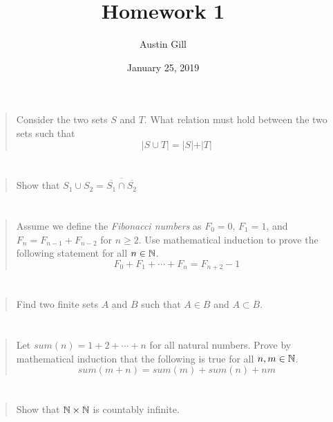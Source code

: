 \documentclass{article}
\title{Homework 1}
\author{Austin Gill}
\date{January 25, 2019}
\begin{document}
\maketitle

\section{}
\begin{quote}
    Consider the two sets $S$ and $T$. What relation must hold between the
    two sets such that
    \[\vert S \cup T \vert = \vert S \vert + \vert T \vert \]
\end{quote}

\section{}
\begin{quote}
    Show that $S_1 \cup S_2 = \overline{\overline{S_1} \cap \overline{S_2}}$
\end{quote}

\section{}
\begin{quote}
    Assume we define the \textit{Fibonacci numbers} as $F_0 = 0$, $F_1 = 1$,
    and $F_n = F_{n-1} + F_{n-2}$ for $n \geq 2$. Use mathematical induction to
    prove the following statement for all $n \in \mathbb{N}$.
    \[F_0 + F_1 + \cdots + F_n = F_{n + 2} - 1\]
\end{quote}

\section{}
\begin{quote}
    Find two finite sets $A$ and $B$ such that $A \in B$ and $A \subset B$.
\end{quote}

\section{}
\begin{quote}
    Let $sum(n) = 1 + 2 + \cdots + n$ for all natural numbers. Prove by
    mathematical induction that the following is true for all $n, m \in \mathbb{N}$.
    \[ sum(m + n) = sum(m) + sum(n) + nm \]
\end{quote}

\section{}
\begin{quote}
    Show that $\mathbb{N} \times \mathbb{N}$ is countably infinite.
\end{quote}
\end{document}
